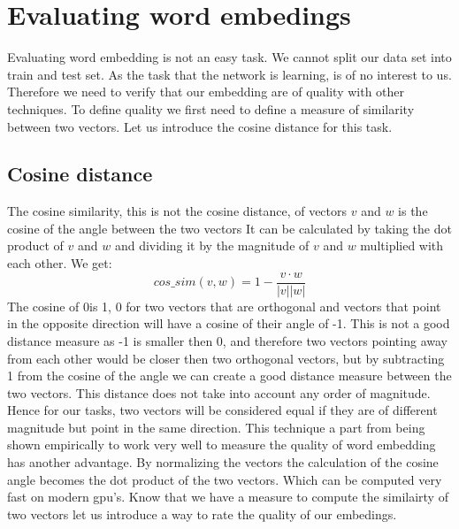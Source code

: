 \section{Evaluating word embedings}
Evaluating word embedding is not an easy task. We cannot split our data set into train and test set. As the task that the network is learning, is of no interest to us. Therefore we need to verify that our embedding are of quality with other techniques. To define quality we first need to define a measure of similarity between two vectors. Let us introduce the cosine distance for this task. 
\subsection{Cosine distance}
The cosine similarity, this is not the cosine distance, of vectors $v$ and $w$ is the cosine of the angle between the two vectors It can be calculated by taking the dot product of $v$ and $w$ and dividing it by the magnitude of $v$ and $w$ multiplied with each other. We get:
\begin{equation}
cos\_sim(v,w) =1 - \frac{v \cdot w}{|v| |w|} 
\end{equation}
The cosine of 0\textdegree is 1,  0 for two vectors that are orthogonal and vectors that point in the opposite direction will have a cosine of their angle of -1. This is not a good distance measure as -1 is smaller then 0, and therefore two vectors pointing away from each other would be closer then two orthogonal vectors, but by subtracting 1 from the cosine of the angle we can create a good distance measure  between the two vectors. This distance does not take into account any order of magnitude. Hence for our tasks, two vectors will be considered equal if they are of different magnitude but point in the same direction. 
This technique a part from being shown empirically to work very well to measure the quality of word embedding has another advantage. By normalizing the vectors the calculation of the cosine angle becomes the dot product of the two vectors. Which can be computed very fast on modern gpu's. 
Know that we have a measure to compute the similairty of two vectors let us introduce a way to rate the quality of our embedings.


